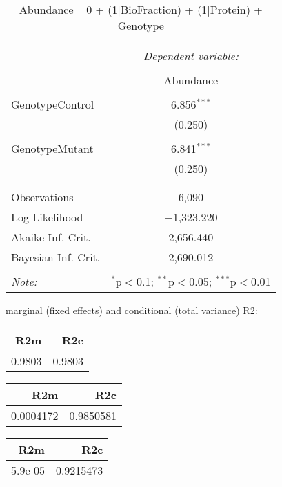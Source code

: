 \documentclass[11pt]{report}
\begin{document}
\begin{table}[!htbp] \centering 
  \caption{Abundance ~ 0 + (1|BioFraction) + (1|Protein) + Genotype} 
  \label{} 
\begin{tabular}{@{\extracolsep{5pt}}lc} 
\\[-1.8ex]\hline 
\hline \\[-1.8ex] 
 & \multicolumn{1}{c}{\textit{Dependent variable:}} \\ 
\cline{2-2} 
\\[-1.8ex] & Abundance \\ 
\hline \\[-1.8ex] 
 GenotypeControl & 6.856$^{***}$ \\ 
  & (0.250) \\ 
  & \\ 
 GenotypeMutant & 6.841$^{***}$ \\ 
  & (0.250) \\ 
  & \\ 
\hline \\[-1.8ex] 
Observations & 6,090 \\ 
Log Likelihood & $-$1,323.220 \\ 
Akaike Inf. Crit. & 2,656.440 \\ 
Bayesian Inf. Crit. & 2,690.012 \\ 
\hline 
\hline \\[-1.8ex] 
\textit{Note:}  & \multicolumn{1}{r}{$^{*}$p$<$0.1; $^{**}$p$<$0.05; $^{***}$p$<$0.01} \\ 
\end{tabular} 
\end{table} 
marginal (fixed effects) and conditional (total variance) R2:

\begin{tabular}{r|r}
\hline
R2m & R2c\\
\hline
0.9803 & 0.9803\\
\hline
\end{tabular}

\begin{tabular}{r|r}
\hline
R2m & R2c\\
\hline
0.0004172 & 0.9850581\\
\hline
\end{tabular}

\begin{tabular}{r|r}
\hline
R2m & R2c\\
\hline
5.9e-05 & 0.9215473\\
\hline
\end{tabular}
\end{document}
